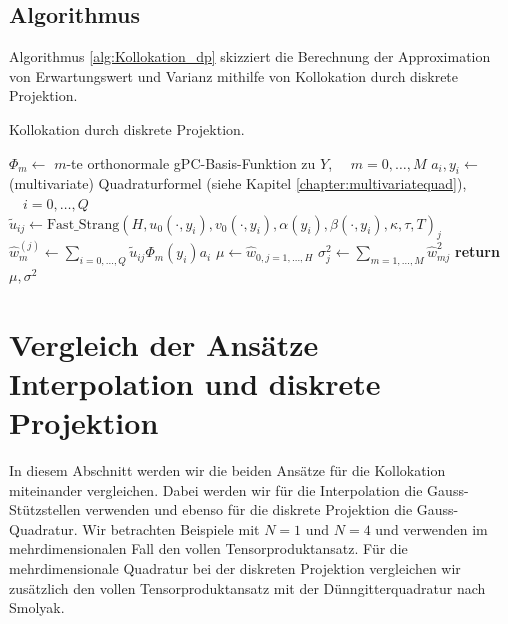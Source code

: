 \subsection{Algorithmus}
Algorithmus \ref{alg:Kollokation_dp} skizziert die Berechnung der Approximation von Erwartungswert und Varianz mithilfe von Kollokation durch diskrete Projektion.
\begin{algorithm}[ht]
    \caption{Kollokation durch diskrete Projektion.}
    \label{alg:Kollokation_dp}
    \begin{algorithmic}[1] %
            \State $\Phi_m\gets$ $m$-te orthonormale gPC-Basis-Funktion zu $Y$, $\quad m=0,\dots,M$
            \State $a_i, y_i\gets$ (multivariate) Quadraturformel (siehe Kapitel \ref{chapter:multivariatequad}), $\quad i=0,\dots,Q$
           		\State $\tilde{u}_{ij}\gets \text{Fast\_Strang}(H,u_0(\cdot, y_i),v_0(\cdot, y_i),\alpha(y_i),\beta(\cdot, y_i),\kappa,\tau,T)_j$
           	\EndFor
            \State $\hat{w}_m^{(j)}\gets \sum_{i=0,\dots,Q}\tilde{u}_{ij}\Phi_m(y_i)a_i$
			\State $\mu\gets \hat{w}_{0,j=1,\dots,H}$ 
			\State $\sigma^2_j\gets \sum_{m=1,\dots,M}\hat{w}^2_{mj}$
			\State \textbf{return} $\mu,\sigma^2$         
        \EndFunction
    \end{algorithmic}
\end{algorithm}
\section{Vergleich der Ansätze Interpolation und diskrete Projektion}
In diesem Abschnitt werden wir die beiden Ansätze für die Kollokation miteinander vergleichen. Dabei werden wir für die Interpolation die Gauss-Stützstellen verwenden und ebenso für die diskrete Projektion die Gauss-Quadratur. Wir betrachten Beispiele mit $N=1$ und $N=4$ und verwenden im mehrdimensionalen Fall den vollen Tensorproduktansatz. Für die mehrdimensionale Quadratur bei der diskreten Projektion vergleichen wir zusätzlich den vollen Tensorproduktansatz mit der Dünngitterquadratur nach Smolyak.
